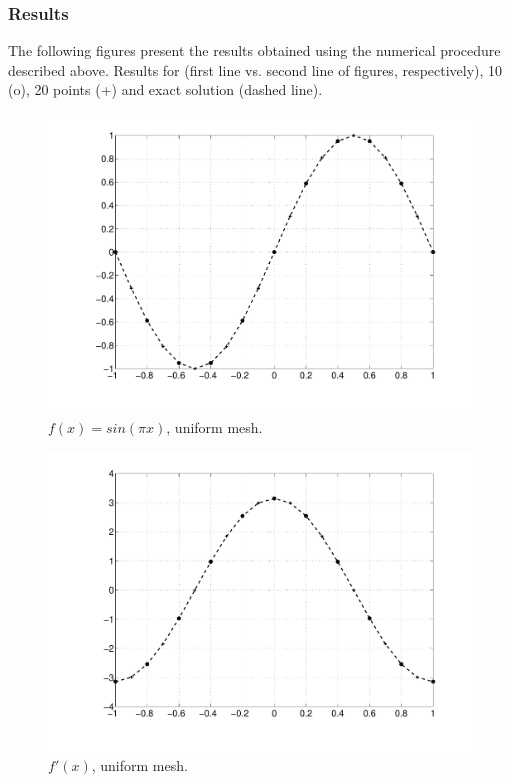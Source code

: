 \newpage
\begin{landscape}
\subsubsection*{ Results }

The following figures present the results obtained using the numerical procedure
described above. Results for  (first line
vs. second line of figures, respectively), 10 (o), 20 points (+) and exact
solution (dashed line).

\begin{multicols}{3}

\begin{figure}[H]
\centering
\includegraphics[scale=0.3, trim = 20mm 0mm 0mm 0mm, clip]{./Figures/1-HOFD/u_u.pdf}
\caption{$f(x)= sin(\pi x)$, uniform mesh. }
\end{figure}

\columnbreak

\begin{figure}[H]
\centering
\includegraphics[scale=0.3, trim = 20mm 0mm 0mm 0mm, clip]{./Figures/1-HOFD/du_u.pdf}
\caption{$f'(x)$, uniform mesh. }
\end{figure}


\end{multicols}
\end{landscape}

